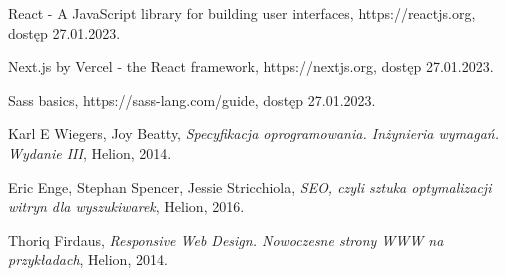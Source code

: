 \documentclass[12pt]{article}
\numberwithin{figure}{section}
\begin{document}
\begin{sloppypar}
\begin{thebibliography}{99}
    React - A JavaScript library for building user interfaces,
    {https://reactjs.org},
    dostęp 27.01.2023.

    Next.js by Vercel - the React framework,
    {https://nextjs.org},
    dostęp 27.01.2023. 

    Sass basics,
    {https://sass-lang.com/guide},
    dostęp 27.01.2023.

    Karl E Wiegers, Joy Beatty,
    \textit{Specyfikacja oprogramowania. Inżynieria wymagań. Wydanie III},
    Helion,
    2014.
    
    Eric Enge, Stephan Spencer, Jessie Stricchiola,
    \textit{SEO, czyli sztuka optymalizacji witryn dla wyszukiwarek},
    Helion,
    2016.

    Thoriq Firdaus,
    \textit{Responsive Web Design. Nowoczesne strony WWW na przykładach},
    Helion, 
    2014.

        
\end{thebibliography}

\end{sloppypar}
\end{document}
